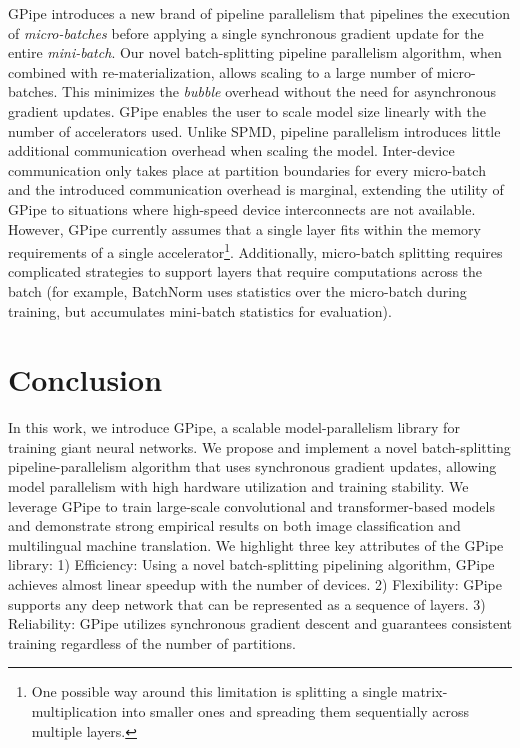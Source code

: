 \documentclass{article}
\def\codename{GPipe}
\begin{document}
\codename{} introduces a new brand of pipeline parallelism that pipelines the execution of \textit{micro-batches} before applying a single synchronous gradient update for the entire \textit{mini-batch}. Our novel batch-splitting pipeline parallelism algorithm, when combined with re-materialization, allows scaling to a large number of micro-batches. This minimizes the \textit{bubble} overhead without the need for asynchronous gradient updates. 
\codename{} enables the user to scale model size linearly with the number of accelerators used. Unlike SPMD, pipeline parallelism introduces little additional communication overhead when scaling the model. Inter-device communication only takes place at partition boundaries for every micro-batch and the introduced communication overhead is marginal, extending the utility of \codename{} to situations where high-speed device interconnects are not available. However, \codename{} currently assumes that a single layer fits within the memory requirements of a single accelerator\footnote{One possible way around this limitation is splitting a single matrix-multiplication into smaller ones and spreading them sequentially across multiple layers.
}. Additionally, micro-batch splitting requires complicated strategies to support layers that require computations across the batch (for example, BatchNorm uses statistics over the micro-batch during training, but accumulates mini-batch statistics for evaluation).


\section{Conclusion}
In this work, we introduce \codename{}, a scalable model-parallelism library for training giant neural networks. We propose and implement a novel batch-splitting pipeline-parallelism algorithm that uses synchronous gradient updates, allowing model parallelism with high hardware utilization and training stability. We leverage \codename{} to train large-scale convolutional and transformer-based models and demonstrate strong empirical results on both image classification and multilingual machine translation. We highlight three key attributes of the \codename{} library: 1) Efficiency: Using a novel batch-splitting pipelining algorithm, \codename{} achieves almost linear speedup with the number of devices. 2) Flexibility: \codename{} supports any deep network that can be represented as a sequence of layers. 3) Reliability: \codename{} utilizes synchronous gradient descent and guarantees consistent training regardless of the number of partitions. 

{\small
%
%
}

\end{document}
